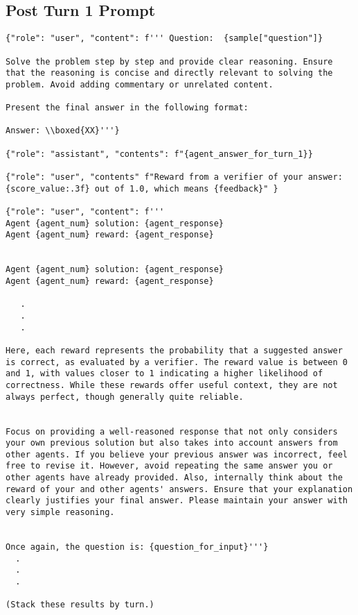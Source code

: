 \subsection{Post Turn 1 Prompt}
\begin{lstlisting}
{"role": "user", "content": f''' Question:  {sample["question"]}

Solve the problem step by step and provide clear reasoning. Ensure that the reasoning is concise and directly relevant to solving the problem. Avoid adding commentary or unrelated content.

Present the final answer in the following format:

Answer: \\boxed{XX}'''}

{"role": "assistant", "contents": f"{agent_answer_for_turn_1}}

{"role": "user", "contents" f"Reward from a verifier of your answer: {score_value:.3f} out of 1.0, which means {feedback}" }

{"role": "user", "content": f'''       
Agent {agent_num} solution: {agent_response}
Agent {agent_num} reward: {agent_response}


Agent {agent_num} solution: {agent_response}
Agent {agent_num} reward: {agent_response}

   . 
   .
   .
   
Here, each reward represents the probability that a suggested answer is correct, as evaluated by a verifier. The reward value is between 0 and 1, with values closer to 1 indicating a higher likelihood of correctness. While these rewards offer useful context, they are not always perfect, though generally quite reliable.

            
Focus on providing a well-reasoned response that not only considers your own previous solution but also takes into account answers from other agents. If you believe your previous answer was incorrect, feel free to revise it. However, avoid repeating the same answer you or other agents have already provided. Also, internally think about the reward of your and other agents' answers. Ensure that your explanation clearly justifies your final answer. Please maintain your answer with very simple reasoning.


Once again, the question is: {question_for_input}'''}
  .
  .
  .

(Stack these results by turn.)

\end{lstlisting}
\clearpage 

